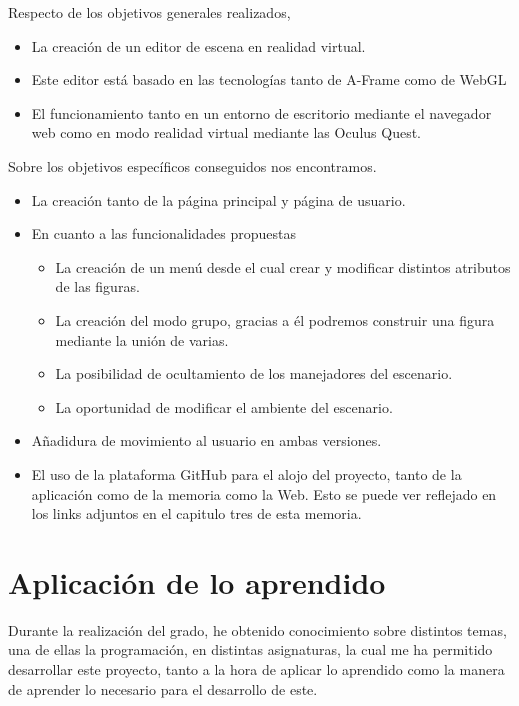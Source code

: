 \documentclass[a4paper, 12pt]{book}
\begin{document}
Respecto de los objetivos generales realizados, 

\begin{itemize}
    \item La creación de un editor de escena en realidad virtual.
    \item Este editor está basado en las tecnologías tanto de A-Frame como de WebGL
    \item El funcionamiento tanto en un entorno de escritorio mediante el navegador web como en modo realidad virtual mediante las Oculus Quest.
\end{itemize}

Sobre los objetivos específicos conseguidos nos encontramos. 
\begin{itemize}
    \item La creación tanto de la página principal y página de usuario.
    \item En cuanto a las funcionalidades propuestas
    \begin{itemize}
        \item La creación de un menú desde el cual crear y modificar distintos atributos de las figuras.
        \item La creación del modo grupo, gracias a él podremos construir una figura mediante la unión de varias.
        \item La posibilidad de ocultamiento de los manejadores del escenario.
        \item La oportunidad de modificar el ambiente del escenario.
    \end{itemize}
    \item Añadidura de movimiento al usuario en ambas versiones.
    \item El uso de la plataforma GitHub para el alojo del proyecto, tanto de la aplicación como de la memoria como la Web. Esto se puede ver reflejado en los links adjuntos en el capitulo tres de esta memoria.
\end{itemize}

\section{Aplicación de lo aprendido}
\label{sec:aplicacion}

Durante la realización del grado, he obtenido conocimiento sobre distintos temas, una de ellas la programación, en distintas asignaturas, la cual me ha permitido desarrollar este proyecto, tanto a la hora de aplicar lo aprendido como la manera de aprender lo necesario para el desarrollo de este.
\end{document}
